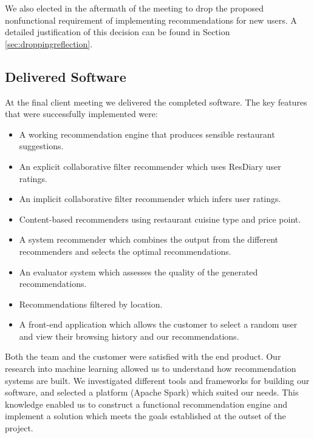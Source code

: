 \documentclass{l3proj}
\begin{document}
We also elected in the aftermath of the meeting to drop the proposed nonfunctional requirement of implementing recommendations for new users. A detailed justification of this decision can be found in Section \ref{sec:droppingreflection}.

\subsection{Delivered Software}
\label{sec:finsoftware}

At the final client meeting we delivered the completed software. The key features that were successfully implemented were:

\begin{itemize}
\item A working recommendation engine that produces sensible restaurant suggestions. 
\item An explicit collaborative filter recommender which uses ResDiary user ratings.
\item An implicit collaborative filter recommender which infers user ratings.
\item Content-based recommenders using restaurant cuisine type and price point.
\item A system recommender which combines the output from the different recommenders and selects the optimal recommendations.
\item An evaluator system which assesses the quality of the generated recommendations.
\item Recommendations filtered by location. 
\item A front-end application which allows the customer to select a random user and view their browsing history and our recommendations.
\end{itemize}

Both the team and the customer were satisfied with the end product. Our research into machine learning allowed us to understand how recommendation systems are built. We investigated different tools and frameworks for building our software, and selected a platform (Apache Spark) which suited our needs. This knowledge enabled us to construct a functional recommendation engine and implement a solution which meets the goals established at the outset of the project. 
\end{document}
